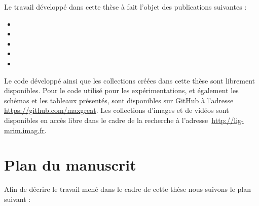 Le travail développé dans cette thèse à fait l'objet des publications suivantes :

\begin{itemize}
	\item {}
	\item {}
	\item {}
	\item {}
	\item {}
\end{itemize}

Le code développé ainsi que les collections créées dans cette thèse sont librement disponibles.
Pour le code utilisé pour les expérimentations, et également les schémas et les tableaux présentés, sont disponibles sur GitHub à l'adresse \url{https://github.com/maxgreat}.
Les collections d'images et de vidéos sont disponibles en accès libre dans le cadre de la recherche à l'adresse~\url{http://lig-mrim.imag.fr}.



\section{Plan du manuscrit}

Afin de décrire le travail mené dans le cadre de cette thèse nous suivons le plan suivant :


